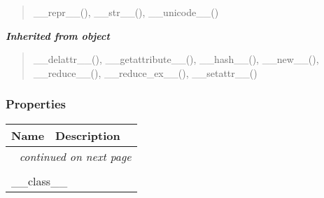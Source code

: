 \begin{quote}
\_\_repr\_\_(), \_\_str\_\_(), \_\_unicode\_\_()
\end{quote}

\large{\textbf{\textit{Inherited from object}}}

\begin{quote}
\_\_delattr\_\_(), \_\_getattribute\_\_(), \_\_hash\_\_(), \_\_new\_\_(), \_\_reduce\_\_(), \_\_reduce\_ex\_\_(), \_\_setattr\_\_()
\end{quote}


  \subsubsection{Properties}

    \vspace{-1cm}
\hspace{\varindent}\begin{longtable}{|p{\varnamewidth}|p{\vardescrwidth}|l}
\cline{1-2}
\cline{1-2} \centering \textbf{Name} & \centering \textbf{Description}& \\
\cline{1-2}
\endhead\cline{1-2}\multicolumn{3}{r}{\small\textit{continued on next page}}\\\endfoot\cline{1-2}
\endlastfoot\multicolumn{2}{|l|}{\textit{Inherited from object}}\\
\multicolumn{2}{|p{\varwidth}|}{\raggedright \_\_class\_\_}\\
\cline{1-2}
\end{longtable}

